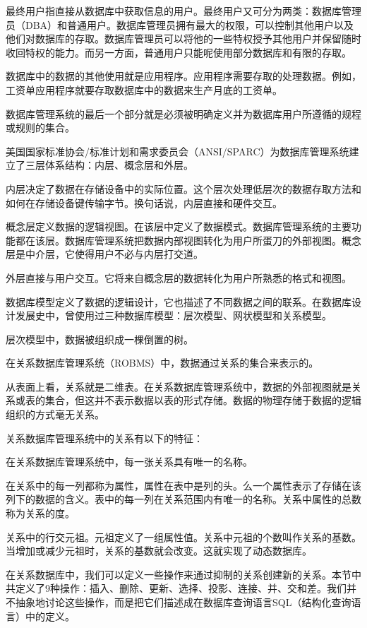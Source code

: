 最终用户指直接从数据库中获取信息的用户。最终用户又可分为两类：数据库管理员（DBA）和普通用户。数据库管理员拥有最大的权限，可以控制其他用户以及他们对数据库的存取。数据库管理员可以将他的一些特权授予其他用户并保留随时收回特权的能力。而另一方面，普通用户只能呢使用部分数据库和有限的存取。\par
数据库中的数据的其他使用就是应用程序。应用程序需要存取的处理数据。例如，工资单应用程序就要存取数据库中的数据来生产月底的工资单。\par
数据库管理系统的最后一个部分就是必须被明确定义并为数据库用户所遵循的规程或规则的集合。\par
美国国家标准协会/标准计划和需求委员会（ANSI/SPARC）为数据库管理系统建立了三层体系结构：内层、概念层和外层。\par
内层决定了数据在存储设备中的实际位置。这个层次处理低层次的数据存取方法和如何在存储设备键传输字节。换句话说，内层直接和硬件交互。\par
概念层定义数据的逻辑视图。在该层中定义了数据模式。数据库管理系统的主要功能都在该层。数据库管理系统把数据内部视图转化为用户所蛋刀的外部视图。概念层是中介层，它使得用户不必与内层打交道。\par
外层直接与用户交互。它将来自概念层的数据转化为用户所熟悉的格式和视图。\par
数据库模型定义了数据的逻辑设计，它也描述了不同数据之间的联系。在数据库设计发展史中，曾使用过三种数据库模型：层次模型、网状模型和关系模型。\par
层次模型中，数据被组织成一棵倒置的树。\par
在关系数据库管理系统（ROBMS）中，数据通过关系的集合来表示的。\par
从表面上看，关系就是二维表。在关系数据库管理系统中，数据的外部视图就是关系或表的集合，但这并不表示数据以表的形式存储。数据的物理存储于数据的逻辑组织的方式毫无关系。\par
关系数据库管理系统中的关系有以下的特征：\par
在关系数据库管理系统中，每一张关系具有唯一的名称。\par
在关系中的每一列都称为属性，属性在表中是列的头。么一个属性表示了存储在该列下的数据的含义。表中的每一列在关系范围内有唯一的名称。关系中属性的总数称为关系的度。\par
关系中的行交元祖。元祖定义了一组属性值。关系中元祖的个数叫作关系的基数。当增加或减少元祖时，关系的基数就会改变。这就实现了动态数据库。\par
在关系数据库中，我们可以定义一些操作来通过抑制的关系创建新的关系。本节中共定义了9种操作：插入、删除、更新、选择、投影、连接、并、交和差。我们并不抽象地讨论这些操作，而是把它们描述成在数据库查询语言SQL（结构化查询语言）中的定义。 \par
